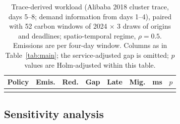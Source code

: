 \begin{table}[!htbp]
\centering
\caption{Trace-derived workload (Alibaba 2018 cluster trace, days 5--8; demand information from days 1--4), paired with 52 carbon windows of 2024 $\times$ 3 draws of origins and deadlines; spatio-temporal regime, $\rho=0.5$. Emissions are per four-day window. Columns as in Table~\ref{tab:main}; the service-adjusted gap is omitted; $p$ values are Holm-adjusted within this table.}
\label{tab:trace}
\footnotesize\setlength{\tabcolsep}{3.5pt}
\begin{tabular}{lrrrrrrl}
\toprule
Policy & Emis. & Red. & Gap & Late & Mig. & ms & $p$ \\
\midrule
{}{table_trace.tex}
\bottomrule
\end{tabular}
\end{table}

\FloatBarrier
\subsection{Sensitivity analysis}\label{sec:sens}





